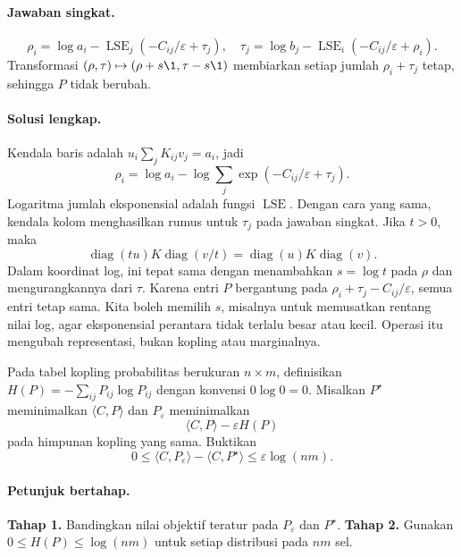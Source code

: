 \paragraph{Jawaban singkat.}
\label{orig03:ps06:answer:0003}
\[
 \rho_i=\log a_i-\operatorname{LSE}_j(-C_{ij}/\varepsilon+\tau_j),
 \quad
 \tau_j=\log b_j-\operatorname{LSE}_i(-C_{ij}/\varepsilon+\rho_i).
\]
Transformasi $(\rho,\tau)\mapsto(\rho+s\1,\tau-s\1)$ membiarkan
setiap jumlah $\rho_i+\tau_j$ tetap, sehingga $P$ tidak berubah.

\paragraph{Solusi lengkap.}
\label{orig03:ps06:solution:0003}
Kendala baris adalah
$u_i\sum_jK_{ij}v_j=a_i$, jadi
\[
 \rho_i=\log a_i-
 \log\sum_j\exp(-C_{ij}/\varepsilon+\tau_j).
\]
Logaritma jumlah eksponensial adalah fungsi $\operatorname{LSE}$. Dengan cara
yang sama, kendala kolom menghasilkan rumus untuk $\tau_j$ pada jawaban
singkat. Jika $t>0$, maka
\[
 \operatorname{diag}(tu)K\operatorname{diag}(v/t)
 =\operatorname{diag}(u)K\operatorname{diag}(v).
\]
Dalam koordinat log, ini tepat sama dengan menambahkan $s=\log t$ pada
$\rho$ dan mengurangkannya dari $\tau$. Karena entri $P$ bergantung pada
$\rho_i+\tau_j-C_{ij}/\varepsilon$, semua entri tetap sama. Kita boleh memilih
$s$, misalnya untuk memusatkan rentang nilai log, agar eksponensial perantara
tidak terlalu besar atau kecil. Operasi itu mengubah representasi, bukan
kopling atau marginalnya.

\begin{exercise}
\label{orig03:ps06:exercise:0004}
Pada tabel kopling probabilitas berukuran $n\times m$, definisikan
$H(P)=-\sum_{ij}P_{ij}\log P_{ij}$ dengan konvensi $0\log0=0$.
Misalkan $P^\star$ meminimalkan $\langle C,P\rangle$ dan $P_\varepsilon$
meminimalkan
\[
 \langle C,P\rangle-\varepsilon H(P)
\]
pada himpunan kopling yang sama. Buktikan
\[
 0\le\langle C,P_\varepsilon\rangle-
       \langle C,P^\star\rangle
 \le\varepsilon\log(nm).
\]
\end{exercise}

\paragraph{Petunjuk bertahap.}
\label{orig03:ps06:hint:0004}
\textbf{Tahap 1.} Bandingkan nilai objektif teratur pada $P_\varepsilon$ dan
$P^\star$.
\textbf{Tahap 2.} Gunakan $0\le H(P)\le\log(nm)$ untuk setiap distribusi pada
$nm$ sel.

